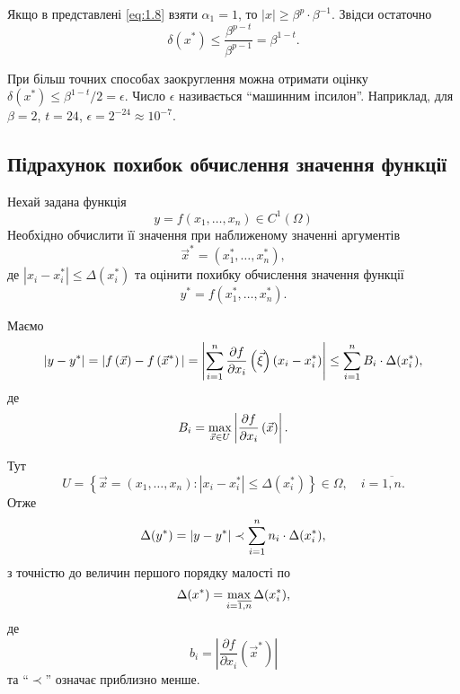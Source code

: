 Якщо в представлені \eqref{eq:1.8} взяти $\alpha_1 = 1$, то $|x| \ge \beta^p \cdot \beta^{-1}$. Звідси остаточно 
\begin{equation}
	\label{eq:1.11}
	\delta (x^*) \le \dfrac{\beta^{p-t}}{\beta^{p-1}}=\beta^{1-t}.
\end{equation}

При більш точних способах заокруглення можна отримати оцінку $\delta (x^*) \le \beta^{1-t} / 2 = \epsilon$. Число $\epsilon$ називається ``машинним іпсилон''. Наприклад, для $\beta = 2$, $t = 24$, $\epsilon = 2^{-24} \approx 10^{-7}$.

\subsection{Підрахунок похибок обчислення значення функції}

Нехай задана функція 
\begin{equation}
	\label{eq:1.11_1}
	y = f(x_1, \ldots, x_n) \in C^1(\Omega)
\end{equation}
Необхідно обчислити її значення при наближеному значенні аргументів 
\begin{equation}
	\label{eq:1.11_2}
	\vec x^* = (x_1^*, \ldots, x_n^*),
\end{equation}
де $|x_i - x_i^*| \le \Delta (x_i^*)$ та оцінити похибку обчислення значення функції
\begin{equation}
	\label{eq:1.11_3}
	y^* = f(x_1^*, \ldots, x_n^*).
\end{equation}

Маємо 
\begin{equation}
	\label{eq:1.12}
	|y-y^*| = |f\left(\vec x\right) - f\left(\vec x^*\right)| = \left| \displaystyle\sum\limits_{i=1}^n \dfrac{\partial f}{\partial x_i} \left(\vec \xi\right) (x_i - x_i^*) \right| \le \displaystyle\sum\limits_{i=1}^n B_i \cdot \Delta (x_i^*), 
\end{equation}
де 
\begin{equation}
	\label{eq:1.13}
	B_i = \displaystyle\max\limits_{\vec x \in U} \left| \dfrac{\partial f}{\partial x_i}\left(\vec x\right) \right|.
\end{equation}

Тут 
\begin{equation}
	\label{eq:1.14}
	U = \left\{ \vec x = (x_1, \ldots, x_n): |x_i - x_i^*| \le \Delta (x_i^*)\right\} \in \Omega, \quad i=\overline{1,n}.
\end{equation}
Отже
\begin{equation}
	\label{eq:1.15}
	\Delta (y^*) = |y - y^*| \prec \displaystyle\sum\limits_{i=1}^n n_i \cdot \Delta (x_i^*),
\end{equation}
з точністю до величин першого порядку малості по
\begin{equation}
	\label{eq:1.15_1}
	\Delta (x^*) = \displaystyle\max\limits_{i=\overline{1,n}} \Delta (x_i^*),
\end{equation}
де
\begin{equation}
	\label{eq:1.16}
	b_i = \left| \dfrac{\partial f}{\partial x_i}\left(\vec x^*\right) \right|
\end{equation}
та ``$\prec$'' означає приблизно менше. \\

